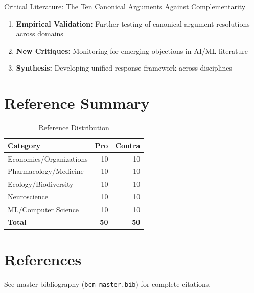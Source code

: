 \begin{chapter}{Critical Literature: The Ten Canonical Arguments Against Complementarity}
\begin{enumerate}
    \item \textbf{Empirical Validation:} Further testing of canonical argument resolutions across domains
    \item \textbf{New Critiques:} Monitoring for emerging objections in AI/ML literature
    \item \textbf{Synthesis:} Developing unified response framework across disciplines
\end{enumerate}

\section{Reference Summary}

\begin{table}[h]
\centering
\caption{Reference Distribution}
\label{tab:reference-summary}
\renewcommand{\arraystretch}{1.2}
\begin{tabular}{@{}lrr@{}}
\toprule
\textbf{Category} & \textbf{Pro} & \textbf{Contra} \\
\midrule
Economics/Organizations & 10 & 10 \\
Pharmacology/Medicine & 10 & 10 \\
Ecology/Biodiversity & 10 & 10 \\
Neuroscience & 10 & 10 \\
ML/Computer Science & 10 & 10 \\
\midrule
\textbf{Total} & \textbf{50} & \textbf{50} \\
\bottomrule
\end{tabular}
\end{table}

\nocite{bcm_master}

\end{chapter}


\section{References}
\label{sec:crt-references}

See master bibliography (\texttt{bcm\_master.bib}) for complete citations.

\nocite{bcm_master}

